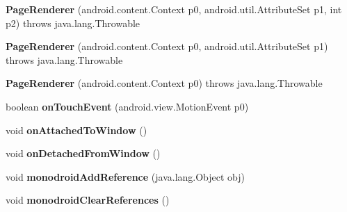 \begin{DoxyCompactItemize}
\item 
\mbox{\label{classmd5b60ffeb829f638581ab2bb9b1a7f4f3f_1_1_page_renderer_acb75aacbb9b00a0617d2f6d02687172b}} 
{\bfseries Page\+Renderer} (android.\+content.\+Context p0, android.\+util.\+Attribute\+Set p1, int p2)  throws java.\+lang.\+Throwable 	
\item 
\mbox{\label{classmd5b60ffeb829f638581ab2bb9b1a7f4f3f_1_1_page_renderer_a451203d230b83724610cc6a9c0ff6d27}} 
{\bfseries Page\+Renderer} (android.\+content.\+Context p0, android.\+util.\+Attribute\+Set p1)  throws java.\+lang.\+Throwable 	
\item 
\mbox{\label{classmd5b60ffeb829f638581ab2bb9b1a7f4f3f_1_1_page_renderer_afd644ee1ae548adf52a3129fc8384a4d}} 
{\bfseries Page\+Renderer} (android.\+content.\+Context p0)  throws java.\+lang.\+Throwable 	
\item 
\mbox{\label{classmd5b60ffeb829f638581ab2bb9b1a7f4f3f_1_1_page_renderer_a83a5007f3a24de66ed291c422b3b2adf}} 
boolean {\bfseries on\+Touch\+Event} (android.\+view.\+Motion\+Event p0)
\item 
\mbox{\label{classmd5b60ffeb829f638581ab2bb9b1a7f4f3f_1_1_page_renderer_a50c8e09a94fb59f2f11fa7ed1f7296e2}} 
void {\bfseries on\+Attached\+To\+Window} ()
\item 
\mbox{\label{classmd5b60ffeb829f638581ab2bb9b1a7f4f3f_1_1_page_renderer_adabdc0dbf9335603861e999017656a19}} 
void {\bfseries on\+Detached\+From\+Window} ()
\item 
\mbox{\label{classmd5b60ffeb829f638581ab2bb9b1a7f4f3f_1_1_page_renderer_a89f8e358b3bf48337c91fc57b5aa1a1e}} 
void {\bfseries monodroid\+Add\+Reference} (java.\+lang.\+Object obj)
\item 
\mbox{\label{classmd5b60ffeb829f638581ab2bb9b1a7f4f3f_1_1_page_renderer_ac993d3d981957dbc682a298a20ceda2b}} 
void {\bfseries monodroid\+Clear\+References} ()
\end{DoxyCompactItemize}

